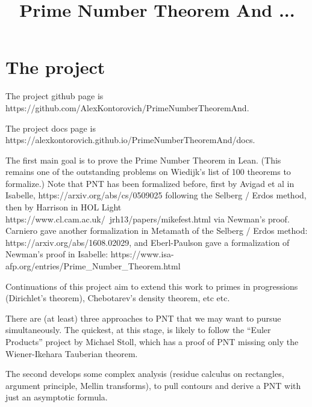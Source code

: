 \usepackage{amsmath, amsthm}

\theoremstyle{definition}
\newtheorem{definition}{Definition}
\newtheorem{theorem}{Theorem}
\newtheorem{proposition}{Proposition}
\newtheorem{lemma}{Lemma}
\newtheorem{corollary}{Corollary}

\title{Prime Number Theorem And ...}

\newcommand{\eps}{\epsilon}

\newcommand{\R}{\mathbb{R}}
\newcommand{\Q}{\mathbb{Q}}
\newcommand{\C}{\mathbb{C}}
\newcommand{\Z}{\mathbb{Z}}
\newcommand{\N}{\mathbb{N}}



\maketitle

\chapter{The project}

The project github page is https://github.com/AlexKontorovich/PrimeNumberTheoremAnd.

The project docs page is https://alexkontorovich.github.io/PrimeNumberTheoremAnd/docs.

The first main goal is to prove the Prime Number Theorem in Lean.
(This remains one of the outstanding problems on Wiedijk's list of 100 theorems to formalize.) 
Note that PNT has been formalized before, first by Avigad et al in Isabelle,
https://arxiv.org/abs/cs/0509025
following the Selberg / Erdos method, then 
by Harrison in HOL Light 
https://www.cl.cam.ac.uk/~jrh13/papers/mikefest.html
via Newman's proof.
Carniero gave another formalization in Metamath of the Selberg / Erdos method:
https://arxiv.org/abs/1608.02029,
and Eberl-Paulson gave a formalization of Newman's proof in Isabelle:
https://www.isa-afp.org/entries/Prime\_Number\_Theorem.html 

Continuations of this project aim to extend
this work to primes in progressions (Dirichlet's theorem), Chebotarev's density theorem, etc
etc.

There are (at least) three approaches to PNT that we may want to pursue simultaneously. The quickest, at this stage, is likely to
follow
 the ``Euler Products'' project by Michael Stoll, which has a proof of PNT missing only the Wiener-Ikehara Tauberian theorem.

The second develops some complex analysis (residue calculus on rectangles, argument principle, Mellin transforms), to pull contours and derive a PNT with just an asymptotic formula.

